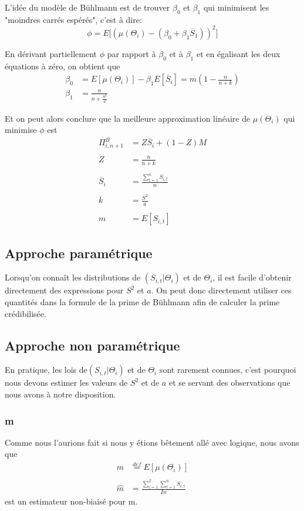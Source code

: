 \documentclass[11pt,french]{report}
\begin{document}
L'idée du modèle de Bühlmann est de trouver $\beta_0$ et $\beta_1$ qui minimisent les "moindres carrés espérés", c'est à dire:
$$\phi = E\bigg[\left(\mu(\Theta_i)-(\beta_0+\beta_1\overline{S}_1) \right)^2\bigg]$$

En dérivant partiellement $\phi$ par rapport à $\beta_0$ et à $\beta_1$ et en égalisant les deux équations à zéro, on obtient que
$$\boxed{\begin{aligned}
\beta_0 &= E[\mu(\Theta_i)] - \beta_1E[\overline{S}_i] = m\left(1-\frac{n}{n+k}\right) \\
\beta_1 &= \frac{n}{n + \frac{S^2}{a}}
\end{aligned}}$$

Et on peut alors conclure que la meilleure approximation linéaire de $\mu({\Theta_i})$ qui minimise $\phi$ est
$$\boxed{\begin{aligned}
\Pi_{i,n+1}^{B} &=  Z \overline{S}_i + (1-Z)M \\ \\
Z &= \frac{n}{n+k} \\ \\
\overline{S}_i &= \frac{\sum_{t=1}^{n} S_{i,t}}{n} \\ \\
k &= \frac{S^2}{a} \\ \\
m &= E[S_{i,t}]
\end{aligned}}$$

\subsection{ Approche paramétrique}

Lorsqu'on connaît les distributions de $(S_{i,t}|\Theta_i)$ et de $\Theta_i$, il est facile d'obtenir directement des expressions pour $S^2$ et $a$. On peut donc directement utiliser ces quantités dans la formule de la prime de Bühlmann afin de calculer la prime crédibilisée.

\subsection{ Approche non paramétrique}

En pratique, les lois de$(S_{i,t}|\Theta_i)$ et de $\Theta_i$ sont rarement connues, c'est pourquoi nous devons estimer les valeurs de $S^2$ et de $a$ et se servant des observations que nous avons à notre disposition.

\subsubsection{m}
Comme nous l'aurions fait si nous y étions bêtement allé avec logique, nous avons que 
$$\boxed{\begin{aligned}
m &\overset{def}{=} E[\mu(\Theta_i)] \\ \\
\widehat{m} &= \frac{\sum_{i=1}^I \sum_{t=1}^n S_{i,t}}{In}
\end{aligned}}$$
est un estimateur non-biaisé pour m.
\end{document}
